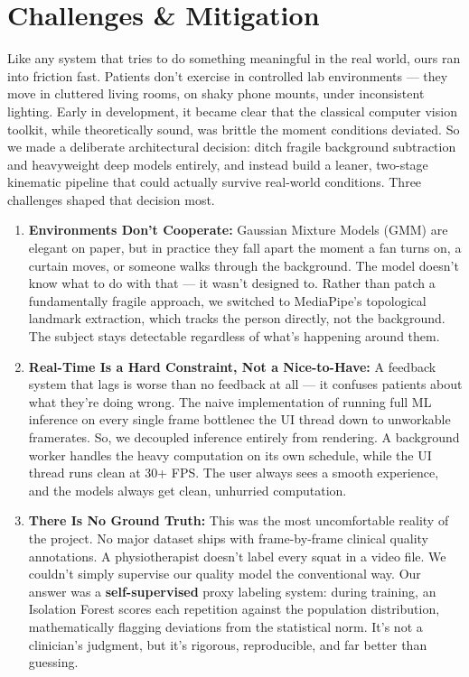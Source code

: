 \documentclass[10pt, twocolumn, a4paper]{article}
\begin{document}
\section{Challenges \& Mitigation}
Like any system that tries to do something meaningful in the real world, ours ran into friction fast. Patients don't exercise in controlled lab environments — they move in cluttered living rooms, on shaky phone mounts, under inconsistent lighting. Early in development, it became clear that the classical computer vision toolkit, while theoretically sound, was brittle the moment conditions deviated. So we made a deliberate architectural decision: ditch fragile background subtraction and heavyweight deep models entirely, and instead build a leaner, two-stage kinematic pipeline that could actually survive real-world conditions. Three challenges shaped that decision most.

\begin{enumerate}[label=\textbf{\arabic*.}]
    \item \textbf{Environments Don't Cooperate:} Gaussian Mixture Models (GMM) are elegant on paper, but in practice they fall apart the moment a fan turns on, a curtain moves, or someone walks through the background. The model doesn't know what to do with that — it wasn't designed to. Rather than patch a fundamentally fragile approach, we switched to MediaPipe's topological landmark extraction, which tracks the person directly, not the background. The subject stays detectable regardless of what's happening around them.

    \item \textbf{Real-Time Is a Hard Constraint, Not a Nice-to-Have:} A feedback system that lags is worse than no feedback at all — it confuses patients about what they're doing wrong. The naive implementation of running full ML inference on every single frame bottlenec the UI thread down to unworkable framerates. So, we decoupled inference entirely from rendering. A background worker handles the heavy computation on its own schedule, while the UI thread runs clean at 30+ FPS. The user always sees a smooth experience, and the models always get clean, unhurried computation.

    \item \textbf{There Is No Ground Truth:} This was the most uncomfortable reality of the project. No major dataset ships with frame-by-frame clinical quality annotations. A physiotherapist doesn't label every squat in a video file. We couldn't simply supervise our quality model the conventional way. Our answer was a \textbf{self-supervised} proxy labeling system: during training, an Isolation Forest scores each repetition against the population distribution, mathematically flagging deviations from the statistical norm. It's not a clinician's judgment, but it's rigorous, reproducible, and far better than guessing.
\end{enumerate}
\end{document}
